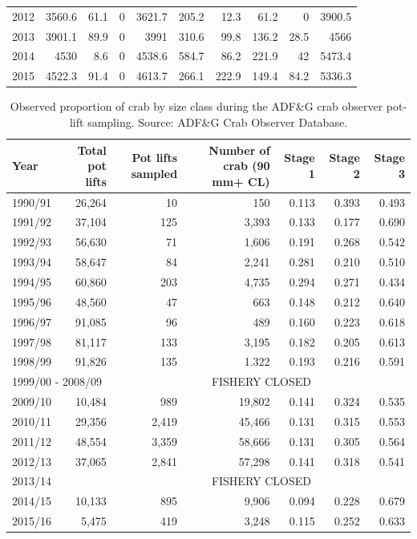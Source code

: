 \documentclass[]{article}
\begin{document}
\begin{table}[ht]
\begin{tabular}{lrrrrrrrrr}
2012 & 3560.6         & 61.1          & 0       & 3621.7  & 205.2       & 12.3    & 61.2          & 0              & 3900.5      \\
2013 & 3901.1         & 89.9          & 0       & 3991    & 310.6       & 99.8    & 136.2         & 28.5           & 4566        \\
2014 & 4530           & 8.6           & 0       & 4538.6  & 584.7       & 86.2    & 221.9         & 42             & 5473.4      \\
2015 & 4522.3         & 91.4          & 0       & 4613.7  & 266.1       & 222.9   & 149.4         & 84.2           & 5336.3      \\
\hline
\end{tabular}
\end{table}

\begin{table}[ht]
\centering
\caption{Observed proportion of crab by size class during the ADF\&G crab observer pot-lift sampling. Source: ADF\&G Crab Observer Database.} 
\label{tab:stage_cpue_1}
\begin{tabular}{lrrrrrr}
  \hline
  Year & Total pot lifts & Pot lifts sampled & Number of crab (90 mm+ CL) & Stage 1 & Stage 2 & Stage 3 \\
  \hline
  1990/91 & 26,264 &  10 &   150 & 0.113 & 0.393 & 0.493 \\
  1991/92 & 37,104 & 125 & 3,393 & 0.133 & 0.177 & 0.690 \\
  1992/93 & 56,630 &  71 & 1,606 & 0.191 & 0.268 & 0.542 \\
  1993/94 & 58,647 &  84 & 2,241 & 0.281 & 0.210 & 0.510 \\
  1994/95 & 60,860 & 203 & 4,735 & 0.294 & 0.271 & 0.434 \\
  1995/96 & 48,560 &  47 &   663 & 0.148 & 0.212 & 0.640 \\
  1996/97 & 91,085 &  96 &   489 & 0.160 & 0.223 & 0.618 \\
  1997/98 & 81,117 & 133 & 3,195 & 0.182 & 0.205 & 0.613 \\
  1998/99 & 91,826 & 135 & 1.322 & 0.193 & 0.216 & 0.591 \\
  \multicolumn{2}{l}{1999/00 - 2008/09} & \multicolumn{5}{c}{FISHERY CLOSED} \\
  2009/10 & 10,484 & 989   & 19,802 & 0.141 & 0.324 & 0.535 \\
  2010/11 & 29,356 & 2,419 & 45,466 & 0.131 & 0.315 & 0.553 \\
  2011/12 & 48,554 & 3,359 & 58,666 & 0.131 & 0.305 & 0.564 \\
  2012/13 & 37,065 & 2,841 & 57,298 & 0.141 & 0.318 & 0.541 \\
  \multicolumn{2}{l}{2013/14} & \multicolumn{5}{c}{FISHERY CLOSED} \\
  2014/15 & 10,133 & 895 & 9,906 & 0.094 & 0.228 & 0.679 \\
  2015/16 &  5,475 & 419 & 3,248 & 0.115 & 0.252 & 0.633 \\
  \hline
\end{tabular}
\end{table}
\end{document}
